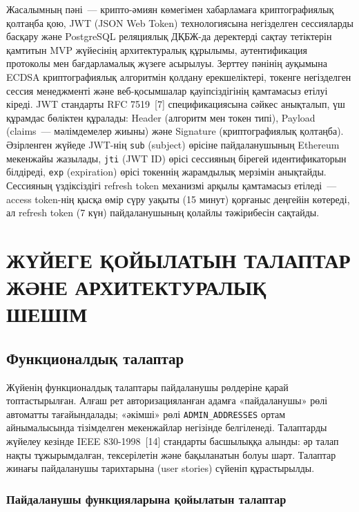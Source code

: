 \documentclass[14pt,a4paper]{extarticle}
\begin{document}
Жасалымның пәні~--- крипто-әмиян көмегімен хабарламаға криптографиялық қолтаңба қою, JWT (JSON Web Token) технологиясына негізделген сессияларды басқару және PostgreSQL реляциялық ДҚБЖ-да деректерді сақтау тетіктерін қамтитын MVP жүйесінің архитектуралық құрылымы, аутентификация протоколы мен бағдарламалық жүзеге асырылуы. Зерттеу пәнінің ауқымына ECDSA криптографиялық алгоритмін қолдану ерекшеліктері, токенге негізделген сессия менеджменті және веб-қосымшалар қауіпсіздігінің қамтамасыз етілуі кіреді. JWT стандарты RFC 7519~[7] спецификациясына сәйкес анықталып, үш құрамдас бөліктен құралады: Header (алгоритм мен токен типі), Payload (claims~--- мәлімдемелер жиыны) және Signature (криптографиялық қолтаңба). Әзірленген жүйеде JWT-нің \texttt{sub} (subject) өрісіне пайдаланушының Ethereum мекенжайы жазылады, \texttt{jti} (JWT ID) өрісі сессияның бірегей идентификаторын білдіреді, \texttt{exp} (expiration) өрісі токеннің жарамдылық мерзімін анықтайды. Сессияның үздіксіздігі refresh token механизмі арқылы қамтамасыз етіледі~--- access token-нің қысқа өмір сүру уақыты (15 минут) қорғаныс деңгейін көтереді, ал refresh token (7 күн) пайдаланушының қолайлы тәжірибесін сақтайды.

\newpage
\section{ЖҮЙЕГЕ ҚОЙЫЛАТЫН ТАЛАПТАР ЖӘНЕ АРХИТЕКТУРАЛЫҚ ШЕШІМ}

\subsection{Функционалдық талаптар}

Жүйенің функционалдық талаптары пайдаланушы рөлдеріне қарай топтастырылған. Алғаш рет авторизацияланған адамға «пайдаланушы» рөлі автоматты тағайындалады; «әкімші» рөлі \texttt{ADMIN\_ADDRESSES} ортам айнымалысында тізімделген мекенжайлар негізінде белгіленеді. Талаптарды жүйелеу кезінде IEEE 830-1998~[14] стандарты басшылыққа алынды: әр талап нақты тұжырымдалған, тексерілетін және бақыланатын болуы шарт. Талаптар жинағы пайдаланушы тарихтарына (user stories) сүйеніп құрастырылды.

\subsubsection{Пайдаланушы функцияларына қойылатын талаптар}
\end{document}
